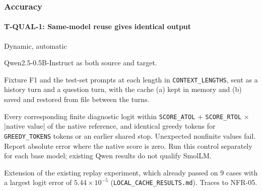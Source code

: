 \documentclass[12pt, titlepage]{article}
\newenvironment{testcase}[2]
  {\Needspace{8\baselineskip}\paragraph{#1: #2}\phantomsection\label{test:#1}\sloppy
   \begin{description}[style=sameline, leftmargin=3.6cm, labelwidth=3.4cm,
     font=\normalfont\bfseries, itemsep=2pt, topsep=2pt]}
  {\end{description}}
\newcommand{\cst}[1]{\texttt{#1}}
\begin{document}
\subsubsection{Accuracy}

\begin{testcase}{T-QUAL-1}{Same-model reuse gives identical output}
\item[Type] Dynamic, automatic
\item[Initial state] Qwen2.5-0.5B-Instruct as both source and target.
\item[Input/Condition] Fixture F1 and the test-set prompts at each length
in \cst{CONTEXT\_LENGTHS}, sent as a history turn and a question turn, with
the cache (a) kept in memory and (b) saved and restored from file between
the turns.
\item[Output/Result] Every corresponding finite diagnostic logit within
\cst{SCORE\_ATOL} + \cst{SCORE\_RTOL} $\times$ |native value| of the
native reference, and identical greedy tokens for \cst{GREEDY\_TOKENS}
tokens or an earlier shared stop. Unexpected nonfinite values fail.
Report absolute error where the native score is zero. Run this control
separately for each base model; existing Qwen results do not qualify SmolLM.
\item[How performed] Extension of the existing replay experiment, which
already passed on 9 cases with a largest logit error of
$5.44\times10^{-5}$ (\texttt{LOCAL\_CACHE\_RESULTS.md}). Traces to
NFR-05.
\end{testcase}
\end{document}
